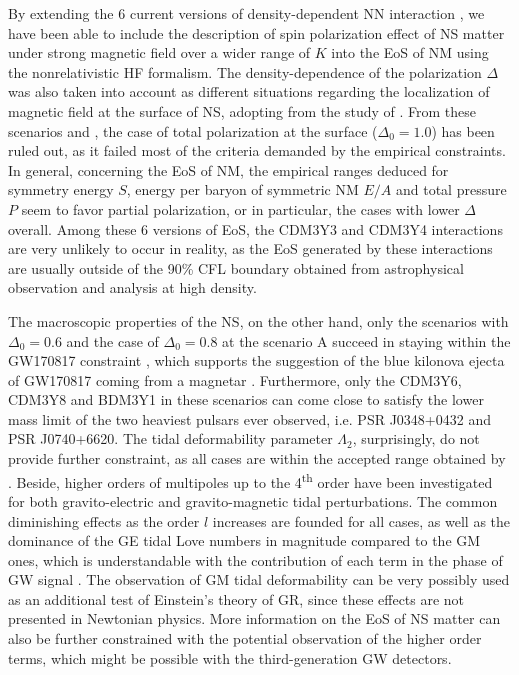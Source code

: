 By extending the 6 current versions of density-dependent \gls{NN} interaction \citep{tan2021equation}, we have been able to include the description of spin polarization effect of \gls{NS} matter under strong magnetic field over a wider range of $K$ into the \gls{EoS} of \gls{NM} using the nonrelativistic \gls{HF} formalism. The density-dependence of the polarization $\Delta$ was also taken into account as different situations regarding the localization of magnetic field at the surface of \gls{NS}, adopting from the study of \cite{tan2020spin}. From these scenarios and , the case of total polarization at the surface ($\Delta_0 = 1.0$) has been ruled out, as it failed most of the criteria demanded by the empirical constraints. In general, concerning the \gls{EoS} of \gls{NM}, the empirical ranges deduced for symmetry energy $S$, energy per baryon of symmetric \gls{NM} $E/A$ and total pressure $P$ seem to favor partial polarization, or in particular, the cases with lower $\Delta$ overall. Among these 6 versions of \gls{EoS}, the CDM3Y3 and CDM3Y4 interactions are very unlikely to occur in reality, as the \gls{EoS} generated by these interactions are usually outside of the 90\% \gls{CFL} boundary obtained from astrophysical observation and analysis at high density.\par
The macroscopic properties of the \gls{NS}, on the other hand, only the scenarios with $\Delta_0 = 0.6$ and the case of $\Delta_0 = 0.8$ at the scenario A succeed in staying within the GW170817 constraint \citep{abbott2018gw170817}, which supports the suggestion of the blue kilonova ejecta of GW170817 coming from a magnetar \citep{metzger2018magnetar,tan2020spin}. Furthermore, only the CDM3Y6, CDM3Y8 and BDM3Y1 in these scenarios can come close to satisfy the lower mass limit of the two heaviest pulsars ever observed, i.e. \gls{PSR} J0348+0432 and \gls{PSR} J0740+6620. The tidal deformability parameter $\Lambda_2$, surprisingly, do not provide further constraint, as all cases are within the accepted range obtained by \cite{abbott2018gw170817}. Beside, higher orders of multipoles up to the 4\textsuperscript{th} order have been investigated for both gravito-electric and gravito-magnetic tidal perturbations. The common diminishing effects as the order $l$ increases are founded for all cases, as well as the dominance of the \gls{GE} tidal Love numbers in magnitude compared to the \gls{GM} ones, which is understandable with the contribution of each term in the phase of \gls{GW} signal \citep{abdelsalhin2018post}. The observation of \gls{GM} tidal deformability can be very possibly used as an additional test of Einstein's theory of \gls{GR}, since these effects are not presented in Newtonian physics. More information on the \gls{EoS} of \gls{NS} matter can also be further constrained with the potential observation of the higher order terms, which might be possible with the third-generation \gls{GW} detectors.
